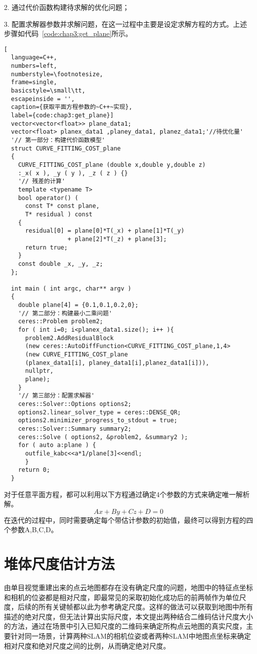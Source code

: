 2. 通过代价函数构建待求解的优化问题；

3. 配置求解器参数并求解问题，在这一过程中主要是设定求解方程的方式。上述步骤如代码~\ref{code:chap3:get_plane}所示。
\begin{lstlisting}[
  language=C++,
  numbers=left,                
  numberstyle=\footnotesize,
  frame=single,     
  basicstyle=\small\tt,    
  escapeinside = '',
  caption={获取平面方程参数的~C++~实现},
  label={code:chap3:get_plane}]
  vector<vector<float>> plane_data1;
  vector<float> planex_data1 ,planey_data1, planez_data1;'//待优化量'
  '// 第一部分：构建代价函数模型'
  struct CURVE_FITTING_COST_plane
  {
    CURVE_FITTING_COST_plane (double x,double y,double z)
    :_x( x ), _y ( y ), _z ( z ) {}
    '// 残差的计算'
    template <typename T>
    bool operator() (
      const T* const plane,    
      T* residual ) const 
    {
      residual[0] = plane[0]*T(_x) + plane[1]*T(_y) 
                  + plane[2]*T(_z) + plane[3]; 
      return true;
    }
    const double _x, _y, _z;
  };

  int main ( int argc, char** argv )
  {   
    double plane[4] = {0.1,0.1,0.2,0};
    '// 第二部分：构建最小二乘问题'
    ceres::Problem problem2;
    for ( int i=0; i<planex_data1.size(); i++ ){
      problem2.AddResidualBlock 
      (new ceres::AutoDiffFunction<CURVE_FITTING_COST_plane,1,4> 
      (new CURVE_FITTING_COST_plane 
      (planex_data1[i], planey_data1[i],planez_data1[i])),
      nullptr,
      plane);
    }
    '// 第三部分：配置求解器'
    ceres::Solver::Options options2;    
    options2.linear_solver_type = ceres::DENSE_QR;
    options2.minimizer_progress_to_stdout = true; 
    ceres::Solver::Summary summary2;                 
    ceres::Solve ( options2, &problem2, &summary2 );
    for ( auto a:plane ) {
      outfile_kabc<<a*1/plane[3]<<endl;
      }
    return 0;
  }
\end{lstlisting}
对于任意平面方程，都可以利用以下方程通过确定4个参数的方式来确定唯一解析解。
\begin{equation}Ax+By+Cz+D= 0\label{equ:plane}\end{equation}
在迭代的过程中，同时需要确定每个带估计参数的初始值，最终可以得到方程的四个参数A,B,C,D。
\section{堆体尺度估计方法}
\label{sec:4.3}
由单目视觉重建出来的点云地图都存在没有确定尺度的问题，地图中的特征点坐标和相机的位姿都是相对尺度，即最常见的采取初始化成功后的前两帧作为单位尺度，后续的所有关键帧都以此为参考确定尺度。这样的做法可以获取到地图中所有描述的绝对尺度，但无法计算出实际尺度，本文提出两种结合二维码估计尺度大小的方法，通过在场景中引入已知尺度的二维码来确定所构点云地图的真实尺度，主要针对同一场景，计算两种SLAM的相机位姿或者两种SLAM中地图点坐标来确定相对尺度和绝对尺度之间的比例，从而确定绝对尺度。
